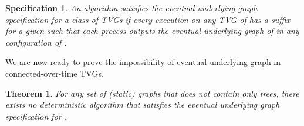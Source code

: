 \documentclass[11pt]{article}
\newtheorem{theorem}{Theorem}
\newtheorem{specification}{Specification}
\begin{document}
\begin{specification}
An algorithm  satisfies the eventual underlying graph specification for a class of TVGs  if every execution  on any TVG  of  has a suffix  for a given  such that each process outputs the eventual underlying graph of  in any configuration of .
\end{specification} 

We are now ready to prove the impossibility of eventual underlying graph in connected-over-time TVGs.

\begin{theorem}\label{th:COTCOT}
For any set of (static) graphs  that does not contain only trees, there exists no deterministic algorithm that satisfies the eventual underlying graph specification for .
\end{theorem}
\end{document}
